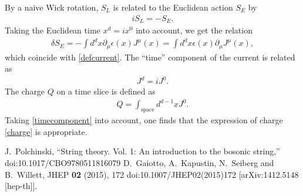 \documentclass[12pt]{scrartcl}
\newcommand{\del}{\partial}
\begin{document}
By a naive Wick rotation, $S_{L}$ is related to the Euclidean action $S_{E}$ by
\begin{align}
    iS_{L}=-S_{E}.
\end{align}
Taking the Euclidean time $x^d=ix^0$ into account, we get the relation
\begin{align}
    \delta S_{E}=-\int d^d x \del_{\mu}\epsilon(x) J^{\mu}(x)=\int d^d x \epsilon(x) \del_{\mu}J^{\mu}(x),
\end{align}
which coincide with \eqref{defcurrent}.  The ``time'' component of the current is related as
\begin{align}
    J^{d}=iJ^{0}.\label{timecomponent}
\end{align}
The charge $Q$ on a time slice is defined as
\begin{align}
    Q=\int_{\text{space}} d^{d-1}x J^{0}.
\end{align}
Taking \eqref{timecomponent} into account, one finds that the expression of charge \eqref{charge} is appropriate.

\begin{thebibliography}{9}
J.~Polchinski,
``String theory. Vol. 1: An introduction to the bosonic string,''
doi:10.1017/CBO9780511816079
D.~Gaiotto, A.~Kapustin, N.~Seiberg and B.~Willett,
JHEP \textbf{02} (2015), 172
doi:10.1007/JHEP02(2015)172
[arXiv:1412.5148 [hep-th]].
\end{thebibliography}
\end{document}
